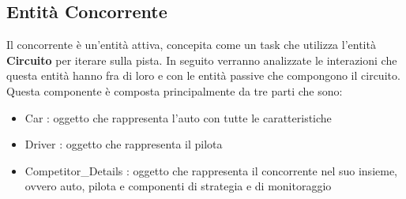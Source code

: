 \subsection{Entit\`{a} Concorrente}
Il concorrente è un'entità attiva, concepita
come un task che utilizza l'entità \textbf{Circuito} per iterare sulla pista. In
seguito
verranno analizzate le interazioni che questa entità hanno fra di loro e con le
entità passive che compongono il circuito.
Questa componente è composta principalmente da tre parti che sono:
\begin{itemize}
\item Car : oggetto che rappresenta l'auto con tutte le caratteristiche
\item Driver : oggetto che rappresenta il pilota
\item Competitor\_Details : oggetto che rappresenta il concorrente nel suo
insieme, ovvero auto, pilota e componenti di strategia e di monitoraggio
\end{itemize}
